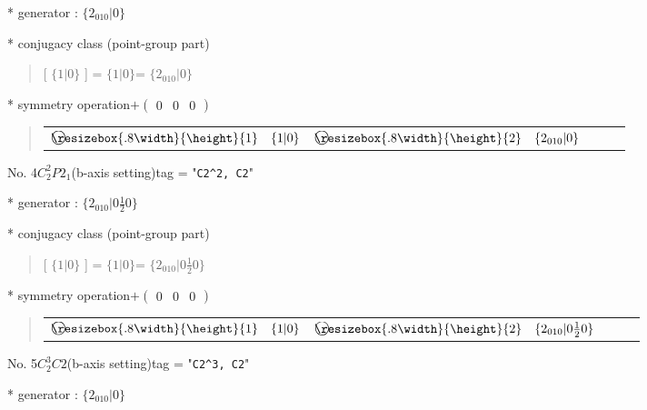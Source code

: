 \documentclass[fleqn,10pt,landscape]{jsarticle}
\begin{document}
* generator : $\{2{}_{010}|0\}$

* conjugacy class (point-group part)
\begin{quote}
[ $\{1|0\}$ ] = \quad $\{1|0\}$\newline[ $\{2{}_{010}|0\}$ ] = \quad $\{2{}_{010}|0\}$\newline
\end{quote}

* symmetry operation\quad$+\begin{pmatrix} 0 & 0 & 0 \end{pmatrix}$
\begin{quote}
\begin{tabular}{lllll}
$ {\ooalign{\hfil\resizebox{.8\width}{\height}{1}\hfil\crcr\raise.1ex\hbox{\large$\bigcirc$}}}\quad \{1|0\} $ & $ {\ooalign{\hfil\resizebox{.8\width}{\height}{2}\hfil\crcr\raise.1ex\hbox{\large$\bigcirc$}}}\quad \{2{}_{010}|0\} $
\end{tabular}
\end{quote}


\newpage

No. 4\quad$C_{2}^{2}$\quad$P2_1$\quad(b-axis setting)\quad[ monoclinic ]
tag = "{\tt C2^2, C2}"

* generator : $\{2{}_{010}|0 \frac{1}{2} 0\}$

* conjugacy class (point-group part)
\begin{quote}
[ $\{1|0\}$ ] = \quad $\{1|0\}$\newline[ $\{2{}_{010}|0 \frac{1}{2} 0\}$ ] = \quad $\{2{}_{010}|0 \frac{1}{2} 0\}$\newline
\end{quote}

* symmetry operation\quad$+\begin{pmatrix} 0 & 0 & 0 \end{pmatrix}$
\begin{quote}
\begin{tabular}{lllll}
$ {\ooalign{\hfil\resizebox{.8\width}{\height}{1}\hfil\crcr\raise.1ex\hbox{\large$\bigcirc$}}}\quad \{1|0\} $ & $ {\ooalign{\hfil\resizebox{.8\width}{\height}{2}\hfil\crcr\raise.1ex\hbox{\large$\bigcirc$}}}\quad \{2{}_{010}|0 \frac{1}{2} 0\} $
\end{tabular}
\end{quote}


\newpage

No. 5\quad$C_{2}^{3}$\quad$C2$\quad(b-axis setting)\quad[ monoclinic ]
tag = "{\tt C2^3, C2}"

* generator : $\{2{}_{010}|0\}$
\end{document}
